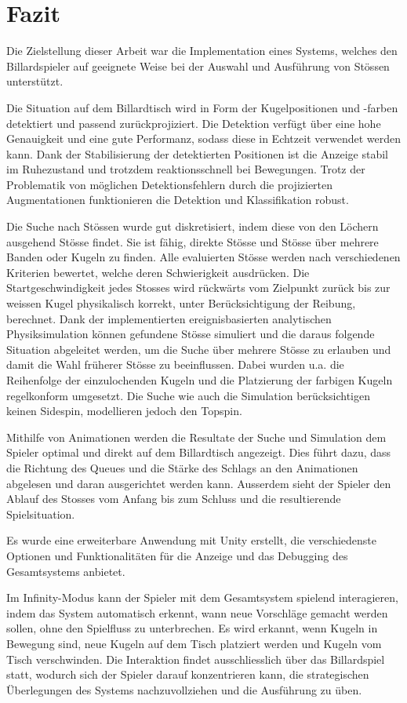 \chapter{Fazit}\label{kap:fazit}
Die Zielstellung dieser Arbeit war die Implementation eines Systems, welches den Billardspieler auf geeignete Weise bei der Auswahl und Ausführung von Stössen unterstützt.

Die Situation auf dem Billardtisch wird in Form der Kugelpositionen und -farben detektiert und passend zurückprojiziert.
Die Detektion verfügt über eine hohe Genauigkeit und eine gute Performanz, sodass diese in Echtzeit verwendet werden kann.
Dank der Stabilisierung der detektierten Positionen ist die Anzeige stabil im Ruhezustand und trotzdem reaktionsschnell bei Bewegungen.
Trotz der Problematik von möglichen Detektionsfehlern durch die projizierten Augmentationen funktionieren die Detektion und Klassifikation robust.

Die Suche nach Stössen wurde gut diskretisiert, indem diese von den Löchern ausgehend Stösse findet.
Sie ist fähig, direkte Stösse und Stösse über mehrere Banden oder Kugeln zu finden.
Alle evaluierten Stösse werden nach verschiedenen Kriterien bewertet, welche deren Schwierigkeit ausdrücken.
Die Startgeschwindigkeit jedes Stosses wird rückwärts vom Zielpunkt zurück bis zur weissen Kugel physikalisch korrekt, unter Berücksichtigung der Reibung, berechnet.
Dank der implementierten ereignisbasierten analytischen Physiksimulation können gefundene Stösse simuliert und die daraus
folgende Situation abgeleitet werden, um die Suche über mehrere Stösse zu erlauben und damit die Wahl früherer Stösse zu beeinflussen.
Dabei wurden u.a. die Reihenfolge der einzulochenden Kugeln und die Platzierung der farbigen Kugeln regelkonform umgesetzt.
Die Suche wie auch die Simulation berücksichtigen keinen Sidespin, modellieren jedoch den Topspin.

Mithilfe von Animationen werden die Resultate der Suche und Simulation dem Spieler optimal und direkt auf dem Billardtisch angezeigt.
Dies führt dazu, dass die Richtung des Queues und die Stärke des Schlags an den Animationen abgelesen und daran ausgerichtet werden kann.
Ausserdem sieht der Spieler den Ablauf des Stosses vom Anfang bis zum Schluss und die resultierende Spielsituation.

Es wurde eine erweiterbare Anwendung mit Unity erstellt, die verschiedenste Optionen und Funktionalitäten
für die Anzeige und das Debugging des Gesamtsystems anbietet.

Im Infinity-Modus kann der Spieler mit dem Gesamtsystem spielend interagieren, indem das System automatisch erkennt, wann
neue Vorschläge gemacht werden sollen, ohne den Spielfluss zu unterbrechen.
Es wird erkannt, wenn Kugeln in Bewegung sind, neue Kugeln auf dem Tisch platziert werden und Kugeln vom Tisch verschwinden.
Die Interaktion findet ausschliesslich über das Billardspiel statt, wodurch sich der Spieler darauf konzentrieren kann,
die strategischen Überlegungen des Systems nachzuvollziehen und die Ausführung zu üben.

